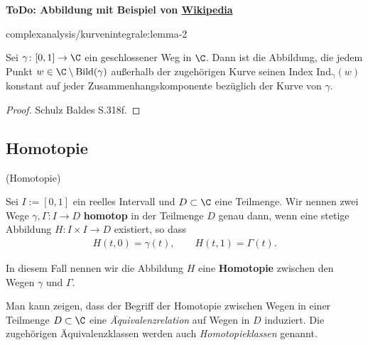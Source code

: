 \documentclass[letterpaper,10pt,german]{jupyterBook}
\begin{document}
\par
\textbf{ToDo: Abbildung mit Beispiel von \href{https://de.wikipedia.org/wiki/Umlaufzahl\_(Mathematik)}{Wikipedia}}
\begin{lemma}{}{complexanalysis/kurvenintegrale:lemma-2}



\par
Sei \(\gamma \colon [0,1] \rightarrow \C\) ein geschlossener Weg in \(\C\).
Dann ist die Abbildung, die jedem Punkt \(w \in \C \setminus \operatorname{Bild}(\gamma)\) außerhalb der zugehörigen Kurve seinen Index \(\operatorname{Ind_\gamma}(w)\) konstant auf jeder Zusammenhangskomponente bezüglich der Kurve von \(\gamma\).
\end{lemma}

\begin{proof}
 Schulz Baldes S.318f.
\end{proof}


\subsection{Homotopie}
\begin{definition}{(Homotopie)}{}\label{complexanalysis/kurvenintegrale:definition-3}



\par
Sei \(I := [0,1]\) ein reelles Intervall und \(D \subset \C\) eine Teilmenge.
Wir nennen zwei Wege \(\gamma, \Gamma \colon I \rightarrow D\) \textbf{homotop} in der Teilmenge \(D\) genau dann, wenn eine stetige Abbildung \(H \colon I \times I \rightarrow D\) existiert, so dass
\begin{align*}
H(t,0) = \gamma(t), \qquad H(t,1) = \Gamma(t).
\end{align*}
\par
In diesem Fall nennen wir die Abbildung \(H\) eine \textbf{Homotopie} zwischen den Wegen \(\gamma\) und \(\Gamma\).
\end{definition}

\par
Man kann zeigen, dass der Begriff der Homotopie zwischen Wegen in einer Teilmenge \(D \subset \C\) eine \emph{Äquivalenzrelation} auf Wegen in \(D\) induziert.
Die zugehörigen Äquivalenzklassen werden auch \emph{Homotopieklassen} genannt.
\end{document}
